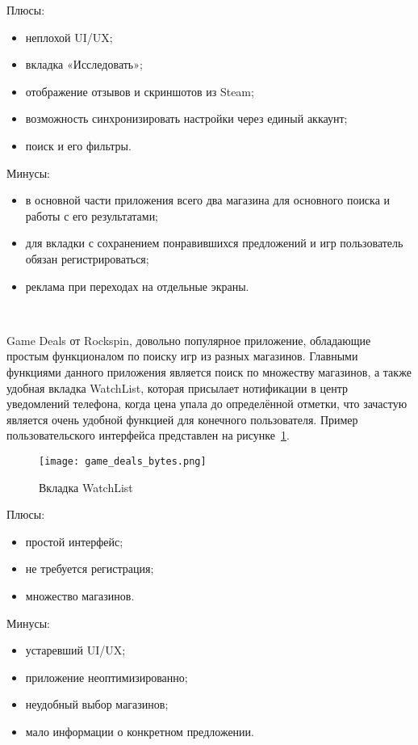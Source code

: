 Плюсы:
\begin{itemize}
 \item неплохой UI/UX;
 \item вкладка «Исследовать»;
 \item отображение отзывов и скриншотов из Steam;
 \item возможность синхронизировать настройки через единый аккаунт;
 \item поиск и его фильтры.
\end{itemize}
 
Минусы:
\begin{itemize}
 \item в основной части приложения всего два магазина для основного поиска и работы с его результатами;
 \item для вкладки с сохранением понравившихся предложений и игр пользователь обязан регистрироваться;
 \item реклама при переходах на отдельные экраны.
\end{itemize}
 
~\par
Game Deals от Rockspin, довольно популярное приложение, обладающие простым функционалом по поиску игр из разных магазинов. Главными функциями данного приложения является поиск по множеству магазинов, а также удобная вкладка WatchList, которая присылает нотификации в центр уведомлений телефона, когда цена упала до определённой отметки, что зачастую является очень удобной функцией для конечного пользователя. Пример пользовательского интерфейса представлен на рисунке~\ref{fig:domain:game_deals_bytes}.
 
\begin{figure}[H]
 \centering
   \texttt{[image: game\_deals\_bytes.png]} 
   \caption{Вкладка WatchList}
   \label{fig:domain:game_deals_bytes}
\end{figure}
 
Плюсы:
\begin{itemize}
 \item простой интерфейс;
 \item не требуется регистрация;
 \item множество магазинов.
\end{itemize}
 
Минусы:
\begin{itemize}
 \item устаревший UI/UX;
 \item приложение неоптимизированно;
 \item неудобный выбор магазинов;
 \item мало информации о конкретном предложении.
\end{itemize}

